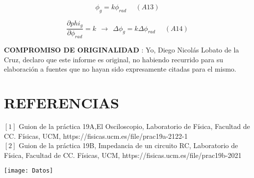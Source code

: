 \documentclass[article, 11pt]{report}
\newcommand{\dpartial}[2]{\frac{\partial #1 }{\partial #2}}
\begin{document}
$$ \phi_g = k\phi_{rad} ~~~~~~ (A13)$$

$$ \dpartial{phi_{g}}{\phi_{rad}} =  k ~~ \rightarrow ~~ \Delta \phi_g = k\Delta\phi_{rad} ~~~~~~ (A14)$$




\textbf{COMPROMISO DE ORIGINALIDAD }: Yo, Diego Nicolás Lobato de la Cruz, declaro que este informe es original, no habiendo recurrido para su elaboración a fuentes que no hayan sido expresamente citadas para el mismo.



	\section{REFERENCIAS}

$[1]$ Guion de la práctica 19A,El Osciloscopio, Laboratorio de Física, Facultad de CC. Físicas, UCM, https://fisicas.ucm.es/file/prac19a-2122-1\\


$[2]$ Guion de la práctica 19B, Impedancia de un circuito RC, Laboratorio de Física, Facultad de CC. Físicas, UCM, https://fisicas.ucm.es/file/prac19b-2021


\newpage 


\centering
\texttt{[image: Datos]}
\end{document}

